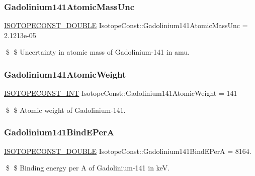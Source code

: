 \subsubsection{\texorpdfstring{Gadolinium141\+Atomic\+Mass\+Unc}{Gadolinium141AtomicMassUnc}}
{\footnotesize\ttfamily \mbox{\hyperlink{group___isotope_const-_macros_ga8f45a7272ce02c0b4c65c44636ed719a}{I\+S\+O\+T\+O\+P\+E\+C\+O\+N\+S\+T\+\_\+\+D\+O\+U\+B\+LE}} Isotope\+Const\+::\+Gadolinium141\+Atomic\+Mass\+Unc = 2.\+1213e-\/05}

\$ \$ Uncertainty in atomic mass of Gadolinium-\/141 in amu. \mbox{\label{group___isotope_const-_gadolinium-_gd141_gaad94327febc7d053ce85c69cca22309f}} 
\subsubsection{\texorpdfstring{Gadolinium141\+Atomic\+Weight}{Gadolinium141AtomicWeight}}
{\footnotesize\ttfamily \mbox{\hyperlink{group___isotope_const-_macros_ga5f18360b3e99483a35c32d789e62621c}{I\+S\+O\+T\+O\+P\+E\+C\+O\+N\+S\+T\+\_\+\+I\+NT}} Isotope\+Const\+::\+Gadolinium141\+Atomic\+Weight = 141}

\$ \$ Atomic weight of Gadolinium-\/141. \mbox{\label{group___isotope_const-_gadolinium-_gd141_ga53bbc8ced38f804a8dc48cfe383c4993}} 
\subsubsection{\texorpdfstring{Gadolinium141\+Bind\+E\+PerA}{Gadolinium141BindEPerA}}
{\footnotesize\ttfamily \mbox{\hyperlink{group___isotope_const-_macros_ga8f45a7272ce02c0b4c65c44636ed719a}{I\+S\+O\+T\+O\+P\+E\+C\+O\+N\+S\+T\+\_\+\+D\+O\+U\+B\+LE}} Isotope\+Const\+::\+Gadolinium141\+Bind\+E\+PerA = 8164.}

\$ \$ Binding energy per A of Gadolinium-\/141 in keV. \mbox{\label{group___isotope_const-_gadolinium-_gd141_ga714deecfcca7f1b161ea0193ee99887a}} 
